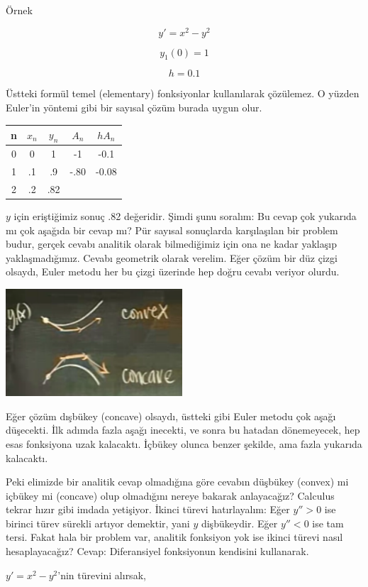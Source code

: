 \documentclass[12pt,fleqn]{article}\usepackage{../../common}
\begin{document}
Örnek

$$ y' = x^2 - y^2 $$

$$ y_1(0) = 1 $$

$$ h = 0.1 $$

Üstteki formül temel (elementary) fonksiyonlar kullanılarak çözülemez. O yüzden
Euler'in yöntemi gibi bir sayısal çözüm burada uygun olur. 

\begin{tabular}{ccccc}
n & $x_n$ & $y_n$ & $A_n$ & $hA_n$ \\
\hline
0 & 0 & 1 & -1 & -0.1 \\
\hline
1 & .1 & .9 & -.80 & -0.08 \\
\hline
2 & .2 & .82 &  & 
\end{tabular}

$y$ için eriştiğimiz sonuç .82 değeridir. Şimdi şunu soralım: Bu cevap çok
yukarıda mı çok aşağıda bir cevap mı? Pür sayısal sonuçlarda karşılaşılan bir
problem budur, gerçek cevabı analitik olarak bilmediğimiz için ona ne kadar
yaklaşıp yaklaşmadığımız. Cevabı geometrik olarak verelim. Eğer çözüm bir düz
çizgi olsaydı, Euler metodu her bu çizgi üzerinde hep doğru cevabı veriyor
olurdu. 

\includegraphics[height=4cm]{2_2.png}

Eğer çözüm dışbükey (concave) olsaydı, üstteki gibi Euler metodu çok aşağı
düşecekti. İlk adımda fazla aşağı inecekti, ve sonra bu hatadan dönemeyecek, hep
esas fonksiyona uzak kalacaktı. İçbükey olunca benzer şekilde, ama fazla
yukarıda kalacaktı. 

Peki elimizde bir analitik cevap olmadığına göre cevabın düşbükey (convex) mi
içbükey mi (concave) olup olmadığını nereye bakarak anlayacağız? Calculus tekrar
hızır gibi imdada yetişiyor. İkinci türevi hatırlayalım: Eğer $y'' > 0$ ise
birinci türev sürekli artıyor demektir, yani $y$ dişbükeydir. Eğer $y'' < 0$ ise
tam tersi. Fakat hala bir problem var, analitik fonksiyon yok ise ikinci türevi
nasıl hesaplayacağız? Cevap: Diferansiyel fonksiyonun kendisini kullanarak.

$y' = x^2 - y^2$'nin türevini alırsak, 
\end{document}
